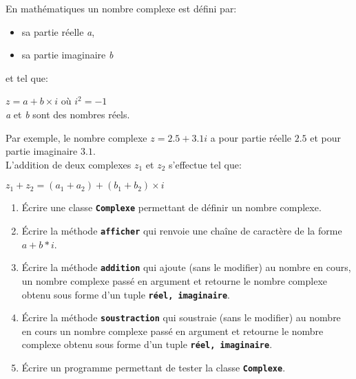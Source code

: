 \documentclass[a4paper,11pt]{article}
\begin{document}
\begin{exo}
    En mathématiques un nombre complexe est défini par:
    \begin{itemize}
        \item sa partie réelle \emph{a},
        \item sa partie imaginaire \emph{b}
    \end{itemize}
    et tel que:
    \begin{center}
        $z= a + b × i$ où $i^2=-1$\\
        \emph{a} et \emph{b} sont des nombres réels.
    \end{center}
    Par exemple, le nombre complexe $z=2.5+3.1i$ a pour partie réelle $2.5$ et pour partie imaginaire $3.1$.\\
    L'addition de deux complexes $z_1$ et $z_2$ s'effectue tel que:
    \begin{center}
        $z_1+z_2=(a_1+a_2)+(b_1+b_2)×i$
    \end{center}

    \begin{enumerate}
        \item Écrire une classe \texttt{\textbf{Complexe}} permettant de définir un nombre complexe.
        \item Écrire la méthode \textbf{\texttt{afficher}} qui renvoie une chaîne de caractère de la forme $a+b*i$.
        \item Écrire la méthode \textbf{\texttt{addition}} qui ajoute (sans le modifier) au nombre en cours, un nombre complexe passé en argument et retourne le nombre complexe obtenu sous forme d'un tuple \textbf{\texttt{réel, imaginaire}}.
        \item Écrire la méthode \textbf{\texttt{soustraction}} qui soustraie (sans le modifier) au nombre en cours un nombre complexe passé en argument et retourne le nombre complexe obtenu sous forme d'un tuple \textbf{\texttt{réel, imaginaire}}.

        \item Écrire un programme permettant de tester la classe \texttt{\textbf{Complexe}}.
    \end{enumerate}
\end{exo}
\end{document}
